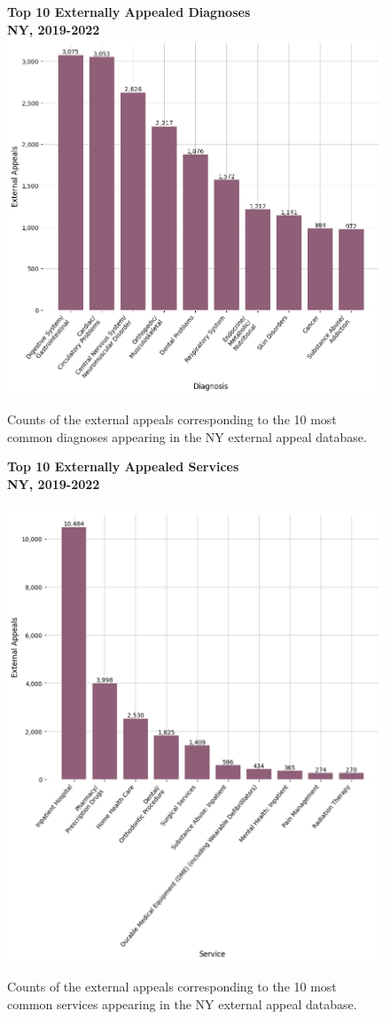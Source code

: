 \documentclass[12pt, a4paper,twoside,parskip=full]{report}
\theoremstyle{plain} %
\theoremstyle{definition} %
\theoremstyle{remark} %
\numberwithin{equation}{chapter}
\begin{document}
		\begin{figure}[h!]
			\centering
			\textbf{Top 10 Externally Appealed Diagnoses}\\
			\textbf{NY, 2019-2022}\\
			\includegraphics[width=.8\textwidth]{images/nys_external/top_externally_appealed_diagnoses.png}
			\caption{Counts of the external appeals corresponding to the 10 most common diagnoses appearing in the NY external appeal database.}
			\label{nyexternalappealsbydiagnosis}
		\end{figure}
		\clearpage
		
		
		\begin{figure}[h!]
			\centering
			\textbf{Top 10 Externally Appealed Services}\\
			\textbf{NY, 2019-2022}\\\
			\includegraphics[width=.8\textwidth]{images/nys_external/top_externally_appealed_treatments.png}
			\caption{Counts of the external appeals corresponding to the 10 most common services appearing in the NY external appeal database.}
			\label{nyexternalappealsbyservice}
		\end{figure}
		\clearpage
		
\end{document}
